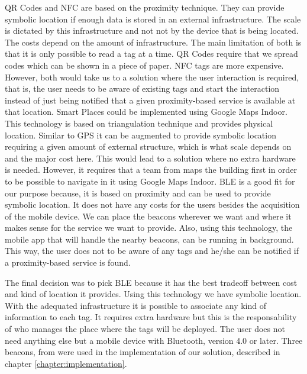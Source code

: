 \gls{QR} Codes and \gls{NFC} are based on the proximity technique.
They can provide symbolic location if enough data is stored in an external infrastructure.
The scale is dictated by this infrastructure and not not by the device that is being located.
The costs depend on the amount of infrastructure.
The main limitation of both is that it is only possible to read a tag at a time.
\gls{QR} Codes require that we spread codes which can be shown in a piece of paper.
\gls{NFC} tags are more expensive.
However, both would take us to a solution where the user interaction is required, that is, the user needs to be aware of existing tags and start the interaction instead of just being notified that a given proximity-based service is available at that location.
Smart Places could be implemented using Google Maps Indoor.
This technology is based on triangulation technique and provides physical location.
Similar to \gls{GPS} it can be augmented to provide symbolic location requiring a given amount of external structure, which is what scale depends on and the major cost here.
This would lead to a solution where no extra hardware is needed.
However, it requires that a team from  maps the building first in order to be possible to navigate in it using Google Maps Indoor.
\gls{BLE} is a good fit for our purpose because, it is based on proximity and can be used to provide symbolic location.
It does not have any costs for the users besides the acquisition of the mobile device.
We can place the beacons wherever we want and where it makes sense for the service we want to provide.
Also, using this technology, the mobile app that will handle the nearby beacons, can be running in background.
This way, the user does not to be aware of any tags and he/she can be notified if a proximity-based service is found.

The final decision was to pick \gls{BLE} because it has the best tradeoff between cost and kind of location it provides. Using this technology we have symbolic location. With the adequated infrastructure it is possible to associate any kind of information to each tag.
It requires extra hardware but this is the responsability of who manages the place where the tags will be deployed.
The user does not need anything else but a mobile device with Bluetooth, version 4.0 or later.
Three beacons, from  were used in the implementation of our solution, described in chapter \ref{chapter:implementation}.

